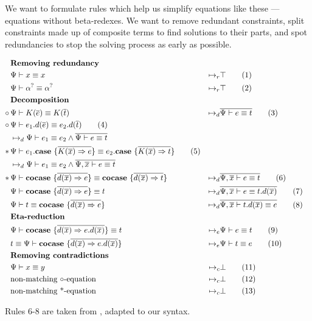 \documentclass[twoside,12pt,a4paper]{article}
\begin{document}
We want to formulate rules which help us simplify equations like these --- equations without beta-redexes.
We want to remove redundant constraints, split constraints made up of composite terms to find solutions to their parts,
and spot redundancies to stop the solving process as early as possible.
\begin{definition}
    \begin{align*}
    &\textbf{Removing redundancy}\\
    &\Psi \vdash x\equiv x&\mapsto_r&\top
    \tag{1}\label{1}\\
    &\Psi \vdash \alpha^? \equiv \alpha^?&\mapsto_r& \top
    \tag{2}\\
    &\textbf{Decomposition}\\
    \circ\,&\Psi\vdash K(\overline{e})\equiv K(\overline{t})&
    \mapsto_d&\overline{\Psi\vdash e\equiv t}
    \tag{3}\label{3}\\
    \circ\,&\Psi \vdash e_1.d({\overline{e}})\equiv e_2.d({\overline{t}})\tag{4}\label{4}
    \\ &\mapsto_d \Psi\vdash e_1 \equiv e_2 \wedge \overline{\Psi\vdash e\equiv t}\\
    *\,&\Psi \vdash e_1.\textbf{case}\ \{\overline{K(\overline{x})\Rightarrow e}\}\equiv e_2.\textbf{case}\ \{\overline{K(\overline{x})\Rightarrow t}\}\tag{5}
    \\ &\mapsto_d \Psi \vdash e_1 \equiv e_2\wedge \overline{\Psi, \overline{x}\vdash e\equiv t}\\
    *\, &\Psi\vdash \textbf{cocase}\ \{\overline{d(\overline{x})\Rightarrow e}\}\equiv 
    \textbf{cocase}\ \{\overline{d(\overline{x})\Rightarrow t}\}
    &\mapsto_d& \overline{\Psi, \overline{x}\vdash e \equiv t}
    \tag{6}\label{6}\\
    &\Psi\vdash \textbf{cocase}\ \{\overline{d(\overline{x})\Rightarrow e}\}\equiv t 
    &\mapsto_d& \overline{\Psi,\overline{x} \vdash e \equiv t.d(\overline{x})}
    \tag{7}\label{7}\\ 
    &\Psi\vdash t\equiv \textbf{cocase}\ \{\overline{d(\overline{x})\Rightarrow e}\} 
    &\mapsto_d& \overline{\Psi, \overline{x}\vdash t.d(\overline{x}) \equiv e}
    \tag{8}\label{8}\\
    &\textbf{Eta-reduction}\\
    & \Psi \vdash \textbf{cocase}\ \{\overline{d(\overline{x})\Rightarrow e.d(\overline{x})}\}\equiv t
    &\mapsto_e&\Psi\vdash e\equiv t
    \tag{9}\label{constraints_eta}\\
    & t \equiv  \Psi \vdash \textbf{cocase}\ \{\overline{d(\overline{x})\Rightarrow e.d(\overline{x})}\}
    &\mapsto_e&\Psi\vdash t\equiv e 
    \tag{10}\\
    &\textbf{Removing contradictions}\\ 
    &\Psi \vdash x\equiv y &\mapsto_c& \bot 
    \tag{11}\\
    &\text{non-matching $\circ$-equation}&\mapsto_c&\bot\tag{12}\\
    &\text{non-matching *-equation}&\mapsto_c& \bot
    \tag{13}\label{13}
    \end{align*}
\end{definition}
Rules 6-8 are taken from \cite{10.5555/2021953.2021960}, adapted to our syntax. 
\end{document}
